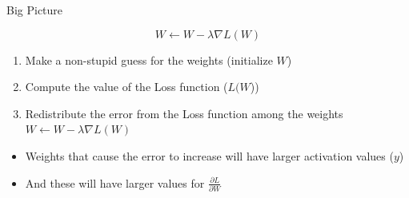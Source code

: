 \documentclass[aspectratio=169]{beamer}
\begin{document}
%
\begin{frame}{Big Picture}

$$W \leftarrow W - \lambda \nabla L (W)$$

\begin{enumerate}
	\item Make a non-stupid guess for the weights (initialize $W$)
	\item Compute the value of the Loss function ($L(W$))
	\item Redistribute the error from the Loss function among the weights  $W \leftarrow W - \lambda \nabla L (W)$
\end{enumerate}
\begin{itemize}
	\item Weights that cause the error to increase will have larger activation values ($y$)
	\item And these will have larger values for $\frac{\partial L}{\partial W}$
\end{itemize}
\end{frame}
\end{document}
